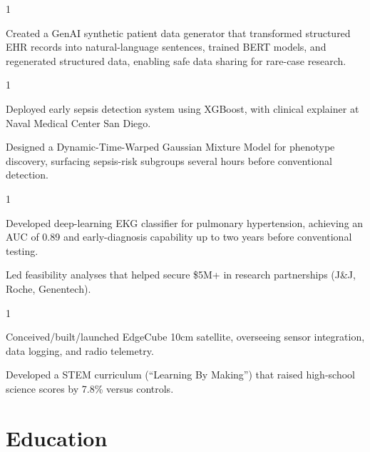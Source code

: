 \documentclass[letterpaper, 11pt]{hunter}
\begin{document}
\begin{entryList}{1}
	\item Created a GenAI synthetic patient data generator that transformed structured EHR records into natural-language sentences, trained BERT models, and regenerated structured data, enabling safe data sharing for rare-case research.
\end{entryList}

\begin{entryList}{1}
    \item Deployed early sepsis detection system using XGBoost, with clinical explainer at Naval Medical Center San Diego.
    \item Designed a Dynamic-Time-Warped Gaussian Mixture Model for phenotype discovery, surfacing sepsis-risk subgroups several hours before conventional detection.
\end{entryList}

\begin{entryList}{1}
  \item Developed deep-learning EKG classifier for pulmonary hypertension, achieving an AUC of 0.89 and early-diagnosis capability up to two years before conventional testing.
	\item Led feasibility analyses that helped secure \$5M+ in research partnerships (J\&J, Roche, Genentech).
\end{entryList}

\begin{entryList}{1}
	\item Conceived/built/launched EdgeCube 10cm satellite, overseeing sensor integration, data logging, and radio telemetry.
	\item Developed a STEM curriculum (“Learning By Making”) that raised high-school science scores by 7.8\% versus controls.
\end{entryList}    


\section{Education}
\end{document}
